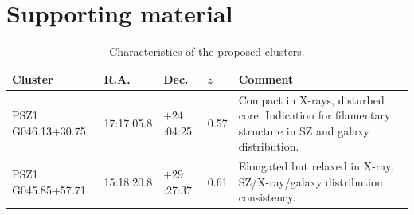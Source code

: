\documentclass[11pt,a4paper,twoside,graphicx,color]{article}
\begin{document}
\section{Supporting material}
\begin{table}[h]
\begin{center}
\resizebox{\textwidth}{!} {
\begin{tabular}{|p{3.4cm}|p{1.6cm}|p{1.6cm}|p{0.6cm}|p{7.3cm}|}
\hline
Cluster & R.A. & Dec. & $z$ & Comment \\
\hline
PSZ1 G046.13+30.75 & 17:17:05.8 & $+24$:04:25 & 0.57 & Compact in X-rays, disturbed core. Indication for filamentary structure in SZ and galaxy distribution. \\
PSZ1 G045.85+57.71 & 15:18:20.8 & $+29$:27:37 & 0.61 & Elongated but relaxed in \mbox{X-ray}. SZ/X-ray/galaxy distribution consistency. \\
\hline
\end{tabular}
}
\end{center}
\caption{\footnotesize Characteristics of the proposed clusters.}
\label{tab:list_gc}
\end{table}
\end{document}
